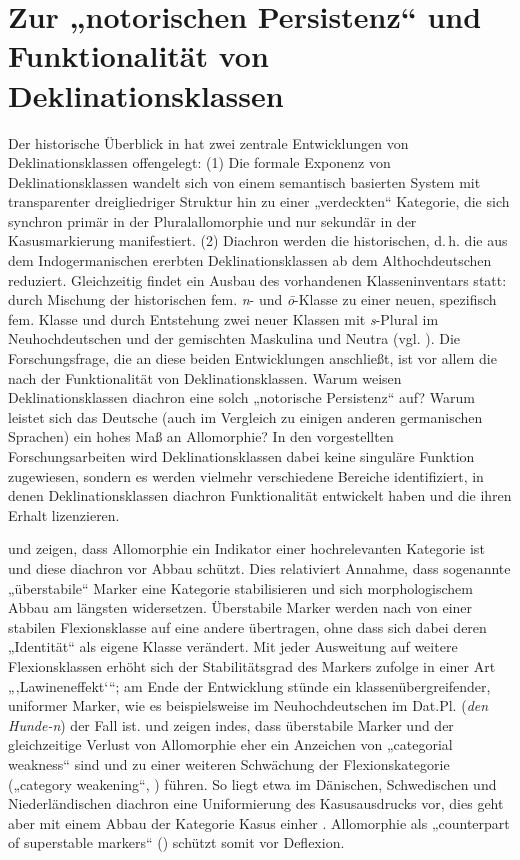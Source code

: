 \section{Zur „notorischen Persistenz“ und Funktionalität von Deklinationsklassen}
\label{sec:3.2}
Der historische Überblick in  hat zwei zentrale Entwicklungen von Deklinationsklassen offengelegt: (1) Die formale Exponenz von Deklinationsklassen wandelt sich von einem semantisch basierten System mit transparenter dreigliedriger Struktur hin zu einer „verdeckten“ Kategorie, die sich synchron primär in der Pluralallomorphie und nur sekundär in der Kasusmarkierung manifestiert. (2) Diachron werden die historischen, d.\,h. die aus dem Indogermanischen ererbten Deklinationsklassen ab dem Althochdeutschen reduziert. Gleichzeitig findet ein Ausbau des vorhandenen Klasseninventars statt: durch Mischung der historischen fem. \textit{n}{}- und \textit{ō}{}-Klasse zu einer neuen, spezifisch fem. Klasse und durch Entstehung zwei neuer Klassen mit \textit{s}{}-Plural im Neuhochdeutschen und der gemischten Maskulina und Neutra (vgl. ). Die Forschungsfrage, die an diese beiden Entwicklungen anschließt, ist vor allem die nach der Funktionalität von Deklinationsklassen. Warum weisen Deklinationsklassen diachron eine solch „notorische Persistenz“ \citep[28]{Nübling2008} auf? Warum leistet sich das Deutsche (auch im Vergleich zu einigen anderen germanischen Sprachen) ein hohes Maß an Allomorphie? In den vorgestellten Forschungsarbeiten wird Deklinationsklassen dabei keine singuläre Funktion zugewiesen, sondern es werden vielmehr verschiedene Bereiche identifiziert, in denen Deklinationsklassen diachron Funktionalität entwickelt haben und die ihren Erhalt lizenzieren.

\citet{DammelNübling2006} und \citet[236--239]{Kürschner2008a} zeigen, dass Allomorphie ein Indikator einer hochrelevanten Kategorie ist und diese diachron vor Abbau schützt. Dies relativiert  Annahme, dass sogenannte „überstabile“ Marker eine Kategorie stabilisieren und sich morphologischem Abbau am längsten widersetzen. Überstabile Marker werden nach \citet[139]{Wurzel1984} von einer stabilen Flexionsklasse auf eine andere übertragen, ohne dass sich dabei deren „Identität“ als eigene Klasse verändert. Mit jeder Ausweitung auf weitere Flexionsklassen erhöht sich der Stabilitätsgrad des Markers \citet[139]{Wurzel1984} zufolge in einer Art „‚Lawineneffekt‘“; am Ende der Entwicklung stünde ein klassenübergreifender, uniformer Marker, wie es beispielsweise im Neuhochdeutschen im Dat.Pl. (\textit{den Hunde-n}) der Fall ist. \citet{DammelNübling2006} und \citet{Kürschner2008a} zeigen indes, dass überstabile Marker und der gleichzeitige Verlust von Allomorphie eher ein Anzeichen von „categorial weakness“ sind und zu einer weiteren Schwächung der Flexionskategorie („category weakening“, \citealt[110]{DammelNübling2006}) führen. So liegt etwa im Dänischen, Schwedischen und Niederländischen diachron eine Uniformierung des Kasusausdrucks vor, dies geht aber mit einem Abbau der Kategorie Kasus einher \citep[238]{Kürschner2008a}. Allomorphie als „counterpart of superstable markers“ (\citealt[99]{DammelNübling2006}) schützt somit vor Deflexion.

